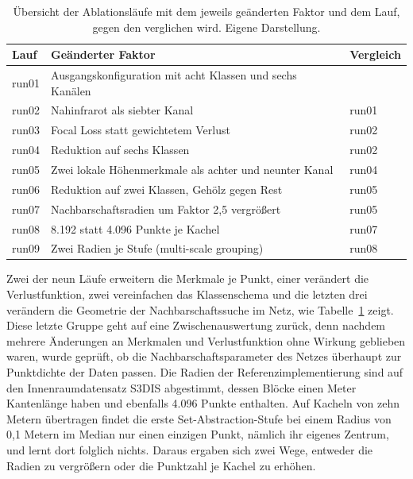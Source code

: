 \begin{table}[H]
    \centering
    \caption[Übersicht der Ablationsläufe]{Übersicht der Ablationsläufe mit dem
    jeweils geänderten Faktor und dem Lauf, gegen den verglichen wird.
    Eigene Darstellung.}
    \label{tab:ablation}
    \begin{tabular}{lll}
    \hline
    Lauf & Geänderter Faktor & Vergleich \\
    \hline
    run01 & Ausgangskonfiguration mit acht Klassen und sechs Kanälen & \\
    run02 & Nahinfrarot als siebter Kanal & run01 \\
    run03 & Focal Loss \cite{Lin.2017} statt gewichtetem Verlust & run02 \\
    run04 & Reduktion auf sechs Klassen & run02 \\
    run05 & Zwei lokale Höhenmerkmale als achter und neunter Kanal & run04 \\
    run06 & Reduktion auf zwei Klassen, Gehölz gegen Rest & run05 \\
    run07 & Nachbarschaftsradien um Faktor 2,5 vergrößert & run05 \\
    run08 & 8.192 statt 4.096 Punkte je Kachel & run07 \\
    run09 & Zwei Radien je Stufe (multi-scale grouping) & run08 \\
    \hline
    \end{tabular}
\end{table}

Zwei der neun Läufe erweitern die Merkmale je Punkt, einer verändert die
Verlustfunktion, zwei vereinfachen das Klassenschema und die letzten drei
verändern die Geometrie der Nachbarschaftssuche im Netz, wie Tabelle~\ref{tab:ablation}
zeigt. Diese letzte Gruppe geht auf eine Zwischenauswertung zurück, denn nachdem
mehrere Änderungen an Merkmalen und Verlustfunktion ohne Wirkung geblieben
waren, wurde geprüft, ob die Nachbarschaftsparameter des Netzes überhaupt zur
Punktdichte der Daten passen.
Die Radien der Referenzimplementierung sind auf den Innenraumdatensatz S3DIS
abgestimmt, dessen Blöcke einen Meter Kantenlänge haben und ebenfalls 4.096
Punkte enthalten. Auf Kacheln von zehn Metern übertragen findet die erste
Set-Abstraction-Stufe bei einem Radius von 0,1 Metern im Median nur einen
einzigen Punkt, nämlich ihr eigenes Zentrum, und lernt dort folglich nichts.
Daraus ergaben sich zwei Wege, entweder die Radien zu vergrößern oder die
Punktzahl je Kachel zu erhöhen.


